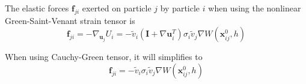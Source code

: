 \documentclass{article}
\newcommand{\xx}{\mathbf{x}}
\newcommand{\II}{\mathbf{I}}
\newcommand{\uu}{\mathbf{u}}
\newcommand{\ff}{\mathbf{f}}
\newcommand{\JJ}{\mathbf{J}}
\begin{document}


The elastic forces $\ff_{ji}$ exerted on particle $j$ by particle $i$ when using the nonlinear Green-Saint-Venant strain tensor is
\begin{equation}
  \ff_{ji} = - \nabla_{\uu_j} U_i = - \tilde{v}_i ( \II + \nabla \uu_i^T) \sigma_i \tilde{v}_j \nabla W(\xx_{ij}^0,h)
\end{equation}

When using Cauchy-Green tensor, it will simplifies to 
\begin{equation}
  \ff_{ji} = - \tilde{v}_i \sigma_i \tilde{v}_j \nabla W(\xx_{ij}^0,h)
\end{equation}





\end{document}

